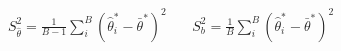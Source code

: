\begin{align*}
    S_{\hat{\theta}}^2 = \frac{1}{B-1} \sum_i^B (\hat{\theta}_i^* - \bar{\theta}^*) ^2\
    &&S_{b}^2 = \frac{1}{B} \sum_i^B (\hat{\theta}_i^* - \bar{\theta}^*) ^2
\end{align*}
